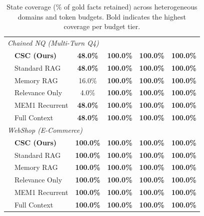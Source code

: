\begin{table}[t]
\begin{tabular}{llcccc}
\midrule
\multicolumn{6}{l}{\textit{Chained NQ (Multi-Turn Q4)}} \\[2pt]
\hspace{3mm} & \textbf{CSC (Ours)} & \textbf{48.0\%} & \textbf{100.0\%} & \textbf{100.0\%} & \textbf{100.0\%} \\
\hspace{3mm} & Standard RAG & \textbf{48.0\%} & \textbf{100.0\%} & \textbf{100.0\%} & \textbf{100.0\%} \\
\hspace{3mm} & Memory RAG & 16.0\% & \textbf{100.0\%} & \textbf{100.0\%} & \textbf{100.0\%} \\
\hspace{3mm} & Relevance Only & 4.0\% & \textbf{100.0\%} & \textbf{100.0\%} & \textbf{100.0\%} \\
\hspace{3mm} & MEM1 Recurrent & \textbf{48.0\%} & \textbf{100.0\%} & \textbf{100.0\%} & \textbf{100.0\%} \\
\hspace{3mm} & Full Context & \textbf{48.0\%} & \textbf{100.0\%} & \textbf{100.0\%} & \textbf{100.0\%} \\
\midrule
\multicolumn{6}{l}{\textit{WebShop (E-Commerce)}} \\[2pt]
\hspace{3mm} & \textbf{CSC (Ours)} & \textbf{100.0\%} & \textbf{100.0\%} & \textbf{100.0\%} & \textbf{100.0\%} \\
\hspace{3mm} & Standard RAG & \textbf{100.0\%} & \textbf{100.0\%} & \textbf{100.0\%} & \textbf{100.0\%} \\
\hspace{3mm} & Memory RAG & \textbf{100.0\%} & \textbf{100.0\%} & \textbf{100.0\%} & \textbf{100.0\%} \\
\hspace{3mm} & Relevance Only & \textbf{100.0\%} & \textbf{100.0\%} & \textbf{100.0\%} & \textbf{100.0\%} \\
\hspace{3mm} & MEM1 Recurrent & \textbf{100.0\%} & \textbf{100.0\%} & \textbf{100.0\%} & \textbf{100.0\%} \\
\hspace{3mm} & Full Context & \textbf{100.0\%} & \textbf{100.0\%} & \textbf{100.0\%} & \textbf{100.0\%} \\
\bottomrule
\end{tabular}
\caption{State coverage (\% of gold facts retained) across heterogeneous domains and token budgets. Bold indicates the highest coverage per budget tier.}
\label{tab:multidomain_coverage}
\end{table}